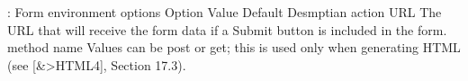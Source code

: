 : Form environment options 
Option Value Default Desmptian 
action URL The URL that will receive the form data if a Submit button is included in 
the form. 
method name Values can be post or get; this is used only when generating HTML (see 
[&>HTML4], Section 17.3). 
